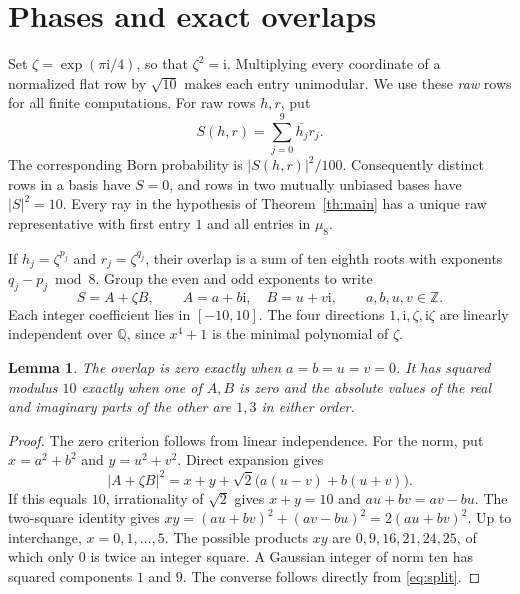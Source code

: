 \documentclass[11pt]{article}
\newtheorem{lemma}[theorem]{Lemma}
\newcommand{\Z}{\mathbb Z}
\newcommand{\Q}{\mathbb Q}
\newcommand{\ii}{\mathrm i}
\begin{document}
\section{Phases and exact overlaps}

Set \(\zeta=\exp(\pi\ii/4)\), so that \(\zeta^2=\ii\).
Multiplying every coordinate of a normalized flat row by \(\sqrt{10}\)
makes each entry unimodular. We use these \emph{raw} rows for all
finite computations. For raw rows \(h,r\), put
\[
                  S(h,r)=\sum_{j=0}^{9}\overline{h_j}r_j .
\]
The corresponding Born probability is \(\lvert S(h,r)\rvert^2/100\).
Consequently distinct rows in a basis have \(S=0\), and rows in two
mutually unbiased bases have \(\lvert S\rvert^2=10\).
Every ray in the hypothesis of Theorem~\ref{th:main} has a unique raw
representative with first entry \(1\) and all entries in \(\mu_8\).

If \(h_j=\zeta^{p_j}\) and \(r_j=\zeta^{q_j}\), their overlap is a
sum of ten eighth roots with exponents \(q_j-p_j\bmod 8\). Group
the even and odd exponents to write
\begin{equation}\label{eq:split}
          S=A+\zeta B,\qquad A=a+b\ii,\quad B=u+v\ii ,
          \qquad a,b,u,v\in\Z .
\end{equation}
Each integer coefficient lies in \([-10,10]\).
The four directions \(1,\ii,\zeta,\ii\zeta\) are linearly independent
over \(\Q\), since \(x^4+1\) is the minimal polynomial of \(\zeta\).

\begin{lemma}\label{le:overlap}
The overlap is zero exactly when \(a=b=u=v=0\). It has squared modulus
\(10\) exactly when one of \(A,B\) is zero and the absolute values of
the real and imaginary parts of the other are \(1,3\) in either order.
\end{lemma}
\begin{proof}
The zero criterion follows from linear independence. For the norm, put
\(x=a^2+b^2\) and \(y=u^2+v^2\). Direct expansion gives
\[
   |A+\zeta B|^2
     =x+y+\sqrt{2}\bigl(a(u-v)+b(u+v)\bigr).
\]
If this equals \(10\), irrationality of \(\sqrt2\) gives \(x+y=10\)
and \(au+bv=av-bu\). The two-square identity gives
\(xy=(au+bv)^2+(av-bu)^2=2(au+bv)^2\).
Up to interchange, \(x=0,1,\ldots,5\). The possible products \(xy\)
are \(0,9,16,21,24,25\), of which only \(0\) is twice an integer square.
A Gaussian integer of norm ten has squared components \(1\) and \(9\).
The converse follows directly from \eqref{eq:split}.
\end{proof}
\end{document}
